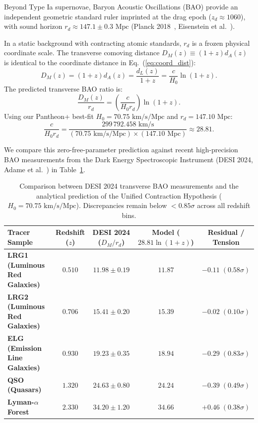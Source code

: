 \documentclass[11pt,a4paper]{article}
\begin{document}
Beyond Type Ia supernovae, Baryon Acoustic Oscillations (BAO) provide an independent geometric standard ruler imprinted at the drag epoch ($z_d \approx 1060$), with sound horizon $r_d \approx 147.1 \pm 0.3\text{ Mpc}$ (Planck 2018~\cite{planck2018}, Eisenstein et al.~\cite{eisenstein2005}).

In a static background with contracting atomic standards, $r_d$ is a frozen physical coordinate scale. The transverse comoving distance $D_M(z) \equiv (1+z) d_A(z)$ is identical to the coordinate distance in Eq.~(\ref{eq:coord_dist}):
\begin{equation}
    D_M(z) = (1+z) d_A(z) = \frac{d_L(z)}{1+z} = \frac{c}{H_0} \ln(1+z).
    \label{eq:dm_bao_en}
\end{equation}
The predicted transverse BAO ratio is:
\begin{equation}
    \frac{D_M(z)}{r_d} = \left( \frac{c}{H_0 r_d} \right) \ln(1+z).
    \label{eq:dm_over_rd_en}
\end{equation}
Using our Pantheon+ best-fit $H_0 = 70.75\text{ km/s/Mpc}$ and $r_d = 147.10\text{ Mpc}$:
\begin{equation}
    \frac{c}{H_0 r_d} = \frac{299\,792.458\text{ km/s}}{(70.75\text{ km/s/Mpc}) \times (147.10\text{ Mpc})} \approx 28.81.
\end{equation}

We compare this zero-free-parameter prediction against recent high-precision BAO measurements from the Dark Energy Spectroscopic Instrument (DESI 2024, Adame et al.~\cite{desi2024}) in Table~\ref{tab:desi_comparison}.

\begin{table}[h!]
    \centering
    \small
    \begin{tabular*}{\textwidth}{@{\extracolsep{\fill}}lcccc@{}}
        \toprule
        \textbf{Tracer Sample}                   & \textbf{Redshift ($z$)} & \textbf{DESI 2024 ($D_M / r_d$)} & \textbf{Model ($28.81 \ln(1+z)$)} & \textbf{Residual / Tension} \\ \midrule
        \textbf{LRG1 (Luminous Red Galaxies)}   & $0.510$ & $11.98 \pm 0.19$ & $\mathbf{11.87}$ & $-0.11 \; (0.58\sigma)$ \\
        \textbf{LRG2 (Luminous Red Galaxies)}   & $0.706$ & $15.41 \pm 0.20$ & $\mathbf{15.39}$ & $-0.02 \; (0.10\sigma)$ \\
        \textbf{ELG (Emission Line Galaxies)}    & $0.930$ & $19.23 \pm 0.35$ & $\mathbf{18.94}$ & $-0.29 \; (0.83\sigma)$ \\
        \textbf{QSO (Quasars)}                   & $1.320$ & $24.63 \pm 0.80$ & $\mathbf{24.24}$ & $-0.39 \; (0.49\sigma)$ \\
        \textbf{Lyman-$\alpha$ Forest}           & $2.330$ & $34.20 \pm 1.20$ & $\mathbf{34.66}$ & $+0.46 \; (0.38\sigma)$ \\ \bottomrule
    \end{tabular*}
    \caption{Comparison between DESI 2024 transverse BAO measurements and the analytical prediction of the Unified Contraction Hypothesis ($H_0 = 70.75\text{ km/s/Mpc}$). Discrepancies remain below $< 0.85\sigma$ across all redshift bins.}
    \label{tab:desi_comparison}
\end{table}
\end{document}

